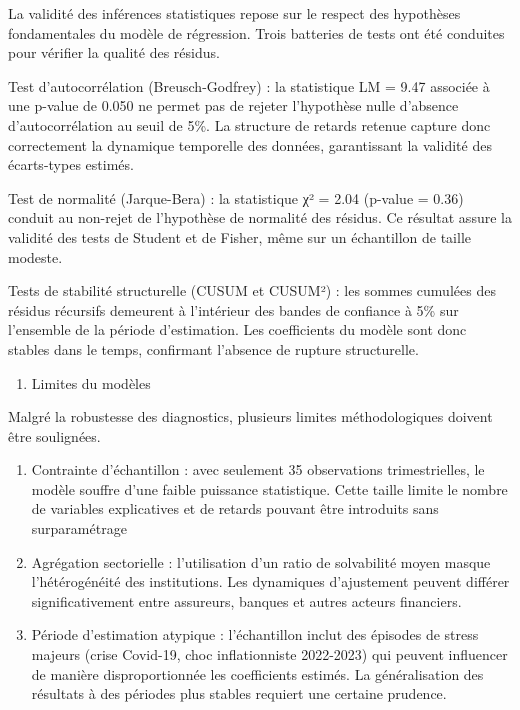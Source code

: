 \documentclass[
]{article}
\providecommand{\tightlist}{%
  \setlength{\itemsep}{0pt}\setlength{\parskip}{0pt}}
\begin{document}
La validité des inférences statistiques repose sur le respect des
hypothèses fondamentales du modèle de régression. Trois batteries de
tests ont été conduites pour vérifier la qualité des résidus.

Test d'autocorrélation (Breusch-Godfrey) : la statistique LM = 9.47
associée à une p-value de 0.050 ne permet pas de rejeter l'hypothèse
nulle d'absence d'autocorrélation au seuil de 5\%. La structure de
retards retenue capture donc correctement la dynamique temporelle des
données, garantissant la validité des écarts-types estimés.

Test de normalité (Jarque-Bera) : la statistique χ² = 2.04 (p-value =
0.36) conduit au non-rejet de l'hypothèse de normalité des résidus. Ce
résultat assure la validité des tests de Student et de Fisher, même sur
un échantillon de taille modeste.

Tests de stabilité structurelle (CUSUM et CUSUM²) : les sommes cumulées
des résidus récursifs demeurent à l'intérieur des bandes de confiance à
5\% sur l'ensemble de la période d'estimation. Les coefficients du
modèle sont donc stables dans le temps, confirmant l'absence de rupture
structurelle.

\begin{enumerate}
\def\labelenumi{(\roman{enumi})}
\setcounter{enumi}{1}
\tightlist
\item
  Limites du modèles
\end{enumerate}

Malgré la robustesse des diagnostics, plusieurs limites méthodologiques
doivent être soulignées.

\begin{enumerate}
\def\labelenumi{\arabic{enumi}.}
\item
  Contrainte d'échantillon : avec seulement 35 observations
  trimestrielles, le modèle souffre d'une faible puissance statistique.
  Cette taille limite le nombre de variables explicatives et de retards
  pouvant être introduits sans surparamétrage
\item
  Agrégation sectorielle : l'utilisation d'un ratio de solvabilité moyen
  masque l'hétérogénéité des institutions. Les dynamiques d'ajustement
  peuvent différer significativement entre assureurs, banques et autres
  acteurs financiers.
\item
  Période d'estimation atypique : l'échantillon inclut des épisodes de
  stress majeurs (crise Covid-19, choc inflationniste 2022-2023) qui
  peuvent influencer de manière disproportionnée les coefficients
  estimés. La généralisation des résultats à des périodes plus stables
  requiert une certaine prudence.
\end{enumerate}
\end{document}
